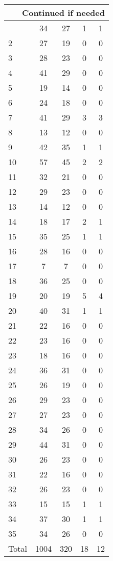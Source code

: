 \begin{center}
\begin{longtable}{l|c|c|c|c}
\hline \multicolumn{5}{|r|}{{Continued if needed}} \\ \hline
\endfoot 
1 & 34 & 27 & 1 & 1\\ \hline
2 & 27 & 19 & 0 & 0\\ \hline
3 & 28 & 23 & 0 & 0\\ \hline
4 & 41 & 29 & 0 & 0\\ \hline
5 & 19 & 14 & 0 & 0\\ \hline
6 & 24 & 18 & 0 & 0\\ \hline
7 & 41 & 29 & 3 & 3\\ \hline
8 & 13 & 12 & 0 & 0\\ \hline
9 & 42 & 35 & 1 & 1\\ \hline
10 & 57 & 45 & 2 & 2\\ \hline
11 & 32 & 21 & 0 & 0\\ \hline
12 & 29 & 23 & 0 & 0\\ \hline
13 & 14 & 12 & 0 & 0\\ \hline
14 & 18 & 17 & 2 & 1\\ \hline
15 & 35 & 25 & 1 & 1\\ \hline
16 & 28 & 16 & 0 & 0\\ \hline
17 & 7 & 7 & 0 & 0\\ \hline
18 & 36 & 25 & 0 & 0\\ \hline
19 & 20 & 19 & 5 & 4\\ \hline
20 & 40 & 31 & 1 & 1\\ \hline
21 & 22 & 16 & 0 & 0\\ \hline
22 & 23 & 16 & 0 & 0\\ \hline
23 & 18 & 16 & 0 & 0\\ \hline
24 & 36 & 31 & 0 & 0\\ \hline
25 & 26 & 19 & 0 & 0\\ \hline
26 & 29 & 23 & 0 & 0\\ \hline
27 & 27 & 23 & 0 & 0\\ \hline
28 & 34 & 26 & 0 & 0\\ \hline
29 & 44 & 31 & 0 & 0\\ \hline
30 & 26 & 23 & 0 & 0\\ \hline
31 & 22 & 16 & 0 & 0\\ \hline
32 & 26 & 23 & 0 & 0\\ \hline
33 & 15 & 15 & 1 & 1\\ \hline
34 & 37 & 30 & 1 & 1\\ \hline
35 & 34 & 26 & 0 & 0\\ \hline
\hline \hline
Total & 1004 & 320 & 18 & 12



\end{longtable}
\end{center}

